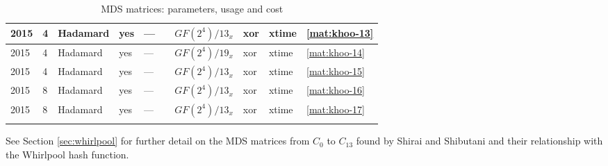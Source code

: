 \begin{footnotesize}
\begin{longtable}[c]{|l|l|l|l|l|l|l|l|l|l|}
2015 & 4 & Hadamard & yes & --- & \cite{LwInvolKhoo2015} & $GF(2^4)/13_x$ & xor & xtime & \eqref{mat:khoo-13} \\ \hline
2015 & 4 & Hadamard & yes & --- & \cite{LwInvolKhoo2015} & $GF(2^4)/19_x$ & xor & xtime & \eqref{mat:khoo-14} \\ \hline
2015 & 4 & Hadamard & yes & --- & \cite{LwInvolKhoo2015} & $GF(2^4)/13_x$ & xor & xtime & \eqref{mat:khoo-15} \\ \hline
2015 & 8 & Hadamard & yes & --- & \cite{LwInvolKhoo2015} & $GF(2^4)/13_x$ & xor & xtime & \eqref{mat:khoo-16} \\ \hline
2015 & 8 & Hadamard & yes & --- & \cite{LwInvolKhoo2015} & $GF(2^4)/13_x$ & xor & xtime & \eqref{mat:khoo-17} \\ \hline

\caption{MDS matrices: parameters, usage and cost}\label{tbl:mds-list}
\end{longtable}
\end{footnotesize}

See Section \ref{sec:whirlpool} for further detail on the MDS matrices from $C_0$ to $C_{13}$ found by Shirai and Shibutani and their relationship with the Whirlpool hash function.
